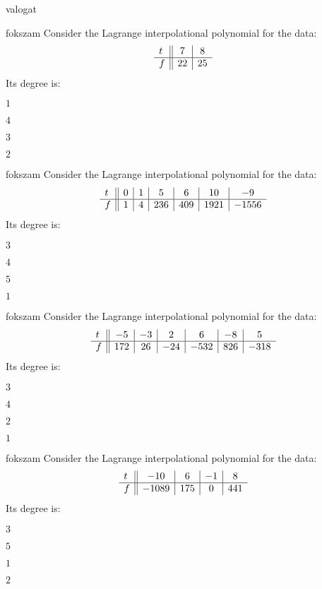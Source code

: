 \documentclass[12pt]{article}
\begin{document}
\begin{quiz}{valogat}
\begin{multi}{fokszam}
Consider the Lagrange interpolational polynomial for the data:
$$\begin{array}{l ||c|c}t&7&8\\ \hline f&22&25 \\ \end{array}$$
Its degree is:
\item* $ 1 $
\item  $ 4 $
\item  $ 3 $
\item  $ 2 $
\end{multi}
\begin{multi}{fokszam}
Consider the Lagrange interpolational polynomial for the data:
$$\begin{array}{l ||c|c|c|c|c|c}t&0&1&5&6&10&-9\\ \hline f&1&4&236&409&1921&-1556 \\ \end{array}$$
Its degree is:
\item* $ 3 $
\item  $ 4 $
\item  $ 5 $
\item  $ 1 $
\end{multi}
\begin{multi}{fokszam}
Consider the Lagrange interpolational polynomial for the data:
$$\begin{array}{l ||c|c|c|c|c|c}t&-5&-3&2&6&-8&5\\ \hline f&172&26&-24&-532&826&-318 \\ \end{array}$$
Its degree is:
\item* $ 3 $
\item  $ 4 $
\item  $ 2 $
\item  $ 1 $
\end{multi}
\begin{multi}{fokszam}
Consider the Lagrange interpolational polynomial for the data:
$$\begin{array}{l ||c|c|c|c}t&-10&6&-1&8\\ \hline f&-1089&175&0&441 \\ \end{array}$$
Its degree is:
\item* $ 3 $
\item  $ 5 $
\item  $ 1 $
\item  $ 2 $
\end{multi}

\end{quiz}
\end{document}
